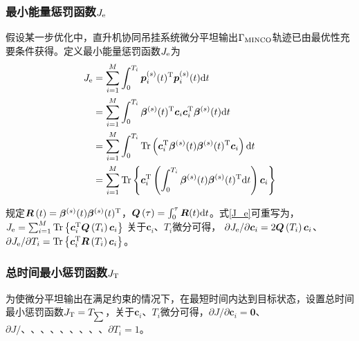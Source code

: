 \subsubsection{最小能量惩罚函数$J_{\rm{e}}$}
假设某一步优化中，直升机协同吊挂系统微分平坦输出$\Gamma_{\rm{MINCO}}$轨迹已由最优性充要条件获得。定义最小能量惩罚函数$J_{\rm{e}}$为
\begin{equation}\label{J_e}
    \begin{aligned}
        J_{\rm{e}} &= \sum\limits_{i=1}^M \int_{0}^{T_i}\boldsymbol{p}_i^{(s)}(t)^{\rm{T}}\boldsymbol{p}_i^{(s)}(t){\rm{d}}t\\
        & = \sum\limits_{i=1}^M\int_0^{T_i}\boldsymbol{\beta}^{(s)}(t)^{\rm{T}}\boldsymbol{c}_i\boldsymbol{c}_i^{\rm{T}}\boldsymbol{\beta}^{(s)}(t){\rm{d}}t\\
        & = \sum\limits_{i=1}^M\int_0^{T_i}{\rm{Tr}}\left(
            \boldsymbol{c}_i^{\rm{T}}\boldsymbol{\beta}^{(s)}(t)\boldsymbol{\beta}^{(s)}(t){\rm{^T}}\boldsymbol{c}_i \right)
            {\rm{d}}t\\
        & = \sum\limits_{i=1}^M{\rm{Tr}}\left\{
        \boldsymbol{c}_i^{\rm{T}}\left( \int_0^{T_i} \boldsymbol{\beta}^{(s)}(t)\boldsymbol{\beta}^{(s)}(t)^{\rm{T}}{\rm{d}}t \right)\boldsymbol{c}_i
        \right\}
    \end{aligned}
\end{equation}

规定$\boldsymbol{R}\left(t\right) = \boldsymbol{\beta}^{(s)}(t)\boldsymbol{\beta}^{(s)}(t)^{\rm{T}}$，$\boldsymbol{Q}\left(\tau \right) = \int_0^{\tau} \boldsymbol{R}(t){\rm{d}}t$。式\ref{J_e}可重写为，$J_{\rm{e}} =\sum\nolimits_{i=1}^M {\rm{Tr}}\left\{\boldsymbol{c}_i^{\rm{T}}\boldsymbol{Q}\left(T_i\right)\boldsymbol{c}_i\right\}$
关于$\boldsymbol{c}_i$、$T_i$微分可得，
${\partial J_{\rm{e}}}/{\partial \boldsymbol{c}_i}  = 2\boldsymbol{Q}\left(T_i\right)\boldsymbol{c}_i$、$
            {\partial J_{\rm{e}}}/{\partial T_i} = {\rm{Tr}}\left\{
            \boldsymbol{c}_i^{\rm{T}}\boldsymbol{R}\left(T_i\right)\boldsymbol{c}_i
            \right\}$。

\subsubsection{总时间最小惩罚函数$J_{\rm{T}}$}
为使微分平坦输出在满足约束的情况下，在最短时间内达到目标状态，设置总时间最小惩罚函数$J_{\rm{T}} = T_{\sum}$，关于$\boldsymbol{c}_i$、$T_i$微分可得，${\partial J}/{\partial \boldsymbol{c}_i} = \boldsymbol{0}$、 ${\partial J}/、、、、、、、、、{\partial T_i} = 1$。
